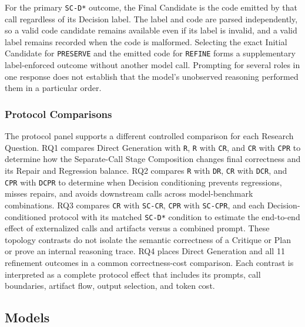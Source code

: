 For the primary \texttt{SC-D*} outcome, the Final Candidate is the code emitted by that call regardless of its Decision label.
The label and code are parsed independently, so a valid code candidate remains available even if its label is invalid, and a valid label remains recorded when the code is malformed.
Selecting the exact Initial Candidate for \texttt{PRESERVE} and the emitted code for \texttt{REFINE} forms a supplementary label-enforced outcome without another model call.
Prompting for several roles in one response does not establish that the model's unobserved reasoning performed them in a particular order.

\subsubsection{Protocol Comparisons}

The protocol panel supports a different controlled comparison for each Research Question.
RQ1 compares Direct Generation with \texttt{R}, \texttt{R} with \texttt{CR}, and \texttt{CR} with \texttt{CPR} to determine how the Separate-Call Stage Composition changes final correctness and its Repair and Regression balance.
RQ2 compares \texttt{R} with \texttt{DR}, \texttt{CR} with \texttt{DCR}, and \texttt{CPR} with \texttt{DCPR} to determine when Decision conditioning prevents regressions, misses repairs, and avoids downstream calls across model-benchmark combinations.
RQ3 compares \texttt{CR} with \texttt{SC-CR}, \texttt{CPR} with \texttt{SC-CPR}, and each Decision-conditioned protocol with its matched \texttt{SC-D*} condition to estimate the end-to-end effect of externalized calls and artifacts versus a combined prompt.
These topology contrasts do not isolate the semantic correctness of a Critique or Plan or prove an internal reasoning trace.
RQ4 places Direct Generation and all 11 refinement outcomes in a common correctness-cost comparison.
Each contrast is interpreted as a complete protocol effect that includes its prompts, call boundaries, artifact flow, output selection, and token cost.

\subsection{Models}

